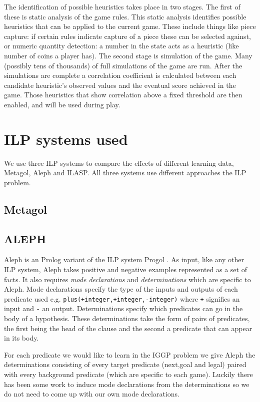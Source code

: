 \documentclass[a4paper,12pt]{report}
\begin{document}
The identification of possible heuristics takes place in two stages. The first of these is static analysis of the game rules. This static analysis identifies possible heuristics that can be applied to the current game. These include things like piece capture: if certain rules indicate capture of a piece these can be selected against, or numeric quantity detection: a number in the state acts as a heuristic (like number of coins a player has). The second stage is simulation of the game. Many (possibly tens of thousands) of full simulations of the game are run. After the simulations are complete a correlation coefficient is calculated between each candidate heuristic's observed values and the eventual score achieved in the game. Those heuristics that show correlation above a fixed threshold are then enabled, and will be used during play.

\chapter{ILP systems used}
We use three ILP systems to compare the effects of different learning data, Metagol, Aleph and ILASP. All three systems use different approaches the ILP problem.
\section{Metagol}

\section{ALEPH}
Aleph is an Prolog variant of the ILP system Progol \cite{Muggleton/Aleph}. As input, like any other ILP system, Aleph takes positive and negative examples represented as a set of facts. It also requires \textit{mode declarations} and \textit{determinations} which are specific to Aleph. Mode declarations specify the type of the inputs and outputs of each predicate used e.g. \texttt{plus(+integer,+integer,-integer)} where \texttt{+} signifies an input and \texttt{-} an output.
Determinations specify which predicates can go in the body of a hypothesis. These determinations take the form of pairs of predicates, the first being the head of the clause and the second a predicate that can appear in its body.

For each predicate we would like to learn in the IGGP problem we give Aleph the determinations consisting of every target predicate (next,goal and legal) paired with every background predicate (which are specific to each game). Luckily there has been some work to induce mode declarations from the determinations \cite{McCreath/Meta-extraction} so we do not need to come up with our own mode declarations.
\end{document}
